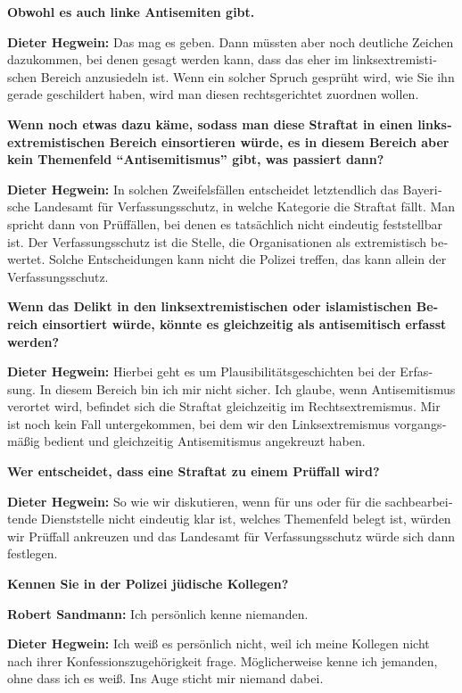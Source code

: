 \begin{otherlanguage}{ngerman}
\textbf{Obwohl es auch linke Antisemiten gibt.}

\textbf{Dieter Hegwein:} Das mag es geben. Dann müssten aber noch deutliche Zeichen dazukommen, bei denen gesagt werden kann, dass das eher im linksextremistischen Bereich anzusiedeln ist. Wenn ein solcher Spruch gesprüht wird, wie Sie ihn gerade geschildert haben, wird man diesen rechtsgerichtet zuordnen wollen.

\textbf{Wenn noch etwas dazu käme, sodass man diese Straftat in einen linksextremistischen Bereich einsortieren würde, es in diesem Bereich aber kein Themenfeld "`Antisemitismus"' gibt, was passiert dann?} 

\textbf{Dieter Hegwein:} In solchen Zweifelsfällen entscheidet letztendlich das Bayerische Landesamt für Verfassungsschutz, in welche Kategorie die Straftat fällt. Man spricht dann von Prüffällen, bei denen es tatsächlich nicht eindeutig feststellbar ist. Der Verfassungsschutz ist die Stelle, die Organisationen als extremistisch bewertet. Solche Entscheidungen kann nicht die Polizei treffen, das kann allein der Verfassungsschutz.

\textbf{Wenn das Delikt in den linksextremistischen oder islamistischen Bereich einsortiert würde, könnte es gleichzeitig als antisemitisch erfasst werden?}

\textbf{Dieter Hegwein:} Hierbei geht es um Plausibilitätsgeschichten bei der Erfassung. In diesem Bereich bin ich mir nicht sicher. Ich glaube, wenn Antisemitismus verortet wird, befindet sich die Straftat gleichzeitig im Rechtsextremismus. Mir ist noch kein Fall untergekommen, bei dem wir den Linksextremismus vorgangsmäßig bedient und gleichzeitig Antisemitismus angekreuzt haben.

\textbf{Wer entscheidet, dass eine Straftat zu einem Prüffall wird?}

\textbf{Dieter Hegwein:} So wie wir diskutieren, wenn für uns oder für die sachbearbeitende Dienststelle nicht eindeutig klar ist, welches Themenfeld belegt ist, würden wir Prüffall ankreuzen und das Landesamt für Verfassungsschutz würde sich dann festlegen. 

\textbf{Kennen Sie in der Polizei jüdische Kollegen?}

\textbf{Robert Sandmann:} Ich persönlich kenne niemanden.

\textbf{Dieter Hegwein:} Ich weiß es persönlich nicht, weil ich meine Kollegen nicht nach ihrer Konfessionszugehörigkeit frage. Möglicherweise kenne ich jemanden, ohne dass ich es weiß. Ins Auge sticht mir niemand dabei.

\end{otherlanguage}
